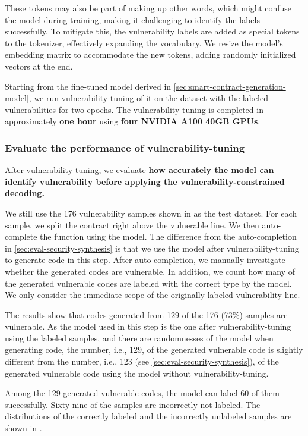 \documentclass[12pt]{book}
\begin{document}
These tokens may also be part of making up other words, which might confuse the model during training, making it challenging to identify the labels successfully. To mitigate this, the vulnerability labels are added as special tokens to the tokenizer, effectively expanding the vocabulary. We resize the model's embedding matrix to accommodate the new tokens, adding randomly initialized vectors at the end.


Starting from the fine-tuned model derived in \cref{sec:smart-contract-generation-model}, we run vulnerability-tuning of it on the dataset with the labeled vulnerabilities for two epochs. The vulnerability-tuning is completed in approximately \textbf{one hour} using \textbf{four NVIDIA A100 40GB GPUs}.

\subsubsection{Evaluate the performance of vulnerability-tuning}
\label{sec:eval-performance-vulnerability-labeling-model}

After vulnerability-tuning, we evaluate  \textbf{how
accurately the model can identify vulnerability before applying the vulnerability-constrained decoding.}

We still use the 176 vulnerability samples shown in  as the test dataset. For each sample, we split the contract right above the vulnerable line. We then auto-complete the function using the model. The difference from the auto-completion in \cref{sec:eval-security-synthesis} is that we use the model after vulnerability-tuning to generate code in this step. After auto-completion, we manually investigate whether the generated codes are vulnerable. In addition, we count how many of the generated vulnerable codes are labeled with the correct type by the model. We only consider the immediate scope of the originally labeled vulnerability line.

The results show that codes generated from 129 of the 176 (73\%) samples are vulnerable. As the model used in this step is the one after vulnerability-tuning using the labeled samples, and there are randomnesses of the model when generating code, the number, i.e., 129, of the generated vulnerable code is slightly different from the number, i.e., 123 (see \cref{sec:eval-security-synthesis}), of the generated vulnerable code using the model without vulnerability-tuning. 

Among the 129 generated vulnerable codes, the model can label 60 of them successfully. Sixty-nine of the samples are incorrectly not labeled. The distributions of the correctly labeled and the incorrectly unlabeled samples are shown in .
\end{document}
